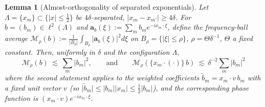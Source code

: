 \documentclass[11pt]{article}
\newtheorem{lemma}[theorem]{Lemma}
\theoremstyle{remark}
\newcommand{\abs}[1]{\lvert #1\rvert}
\newcommand{\SET}[1]{\{#1\}}
\begin{document}
\begin{lemma}[Almost-orthogonality of separated exponentials]\label{lem:ao}
Let $\Lambda=\SET{x_m}\subset\SET{\abs x\le\tfrac12}$ be
$4\delta$-separated, $\abs{x_m-x_{m'}}\ge4\delta$. For
$b=(b_m)\in\ell^{2}(\Lambda)$ and $\mathbf a_b(\xi):=\sum_m b_m
e^{-ix_m\cdot\xi}$, define the frequency-ball average
$\mathcal M_\rho(b):=\frac{1}{\abs{B_\rho}}\int_{B_\rho}
\abs{\mathbf a_b(\xi)}^{2}d\xi$ on $B_\rho=\SET{\abs\xi\le\rho}$,
$\rho=\Theta\delta^{-1}$, $\Theta$ a fixed constant. Then, uniformly in
$\delta$ and the configuration $\Lambda$,
\begin{equation}\label{eq:aobound}
\mathcal M_\rho(b)\ \lesssim\ \sum_m \abs{b_m}^{2},
\qquad\text{and}\qquad
\mathcal M_\rho(\SET{x_m\cdot(\cdot)}\,b)\ \lesssim\
\delta^{-2}\sum_m\abs{b_m}^{2}
\end{equation}
where the second statement applies to the weighted coefficients
$\widetilde b_m=x_m\cdot v\,b_m$ with a fixed unit vector $v$ (so
$\abs{\widetilde b_m}\le\abs{b_m}\abs{x_m}\le\tfrac12\abs{b_m}$), and the
corresponding phase function is $(x_m\cdot v)e^{-ix_m\cdot\xi}$.
\end{lemma}
\end{document}
